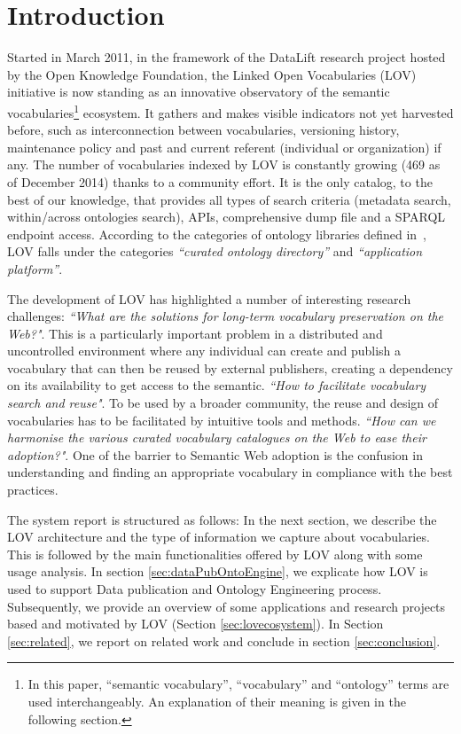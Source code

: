 \documentclass{iosart2c}
\begin{document}
\section{Introduction}
Started in March 2011, in the framework of the DataLift research project \cite{scharffe_2012} hosted by the Open Knowledge Foundation, the Linked Open Vocabularies (LOV) initiative is now standing as an innovative observatory of the semantic vocabularies\footnote{In this paper, ``semantic vocabulary'', ``vocabulary'' and ``ontology'' terms are used interchangeably. An explanation of their meaning is given in the following section.} ecosystem. It gathers and makes visible indicators not yet harvested before, such as interconnection between vocabularies, versioning history, maintenance policy and past and current referent (individual or organization) if any. The number of vocabularies indexed by LOV is constantly growing (469 as of December 2014) thanks to a community effort. It is the only catalog, to the best of our knowledge, that provides all types of search criteria (metadata search, within/across ontologies search), APIs, comprehensive dump file and a SPARQL endpoint access. According to the categories of ontology libraries defined in~\cite{AquinJoWS12}, LOV falls under the categories \textit{``curated ontology directory''}  and \textit{``application platform''}.

The development of LOV has highlighted a number of interesting research challenges: \textit{``What are the solutions for long-term vocabulary preservation on the Web?"}\cite{Baker2013HLT}. This is a particularly important problem in a distributed and uncontrolled environment where any individual can create and publish a vocabulary that can then be reused by external publishers, creating a dependency on its availability to get access to the semantic. \textit{``How to facilitate vocabulary search and reuse"}\cite{butt2014, poveda2012landscape}. To be used by a broader community, the reuse and design of vocabularies has to be facilitated by intuitive tools and methods.  \textit{``How can we harmonise the various curated vocabulary catalogues on the Web to ease their adoption?"}\cite{wasabi13}. One of the barrier to Semantic Web adoption is the confusion in understanding and finding an appropriate vocabulary in compliance with the best practices.

The system report is structured as follows: In the next section, we describe the LOV architecture and the type of information we capture about vocabularies. This is followed by the main functionalities offered by LOV along with some usage analysis. In section \ref{sec:dataPubOntoEngine}, we explicate how LOV is used to support Data publication and Ontology Engineering process. Subsequently, we provide an overview of some applications and research projects based and motivated by LOV (Section \ref{sec:lovecosystem}). In Section \ref{sec:related}, we report on related work and conclude in section \ref{sec:conclusion}.
\end{document}
